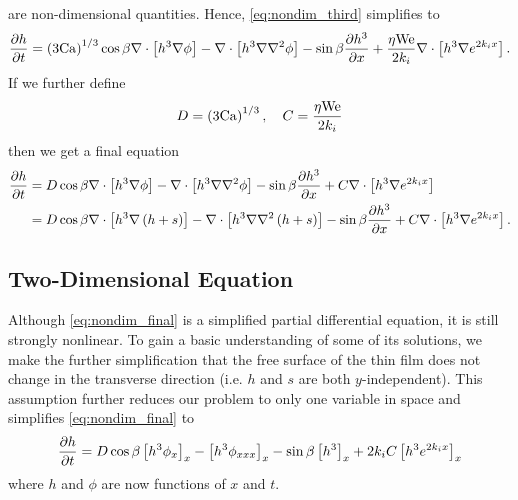 are non-dimensional quantities. Hence, 
\cref{eq:nondim_third} simplifies to 
\begin{align}
    \frac{\partial h}{\partial t} = \left( 3\mathrm{Ca} \right)^{1/3} \cos\beta \nabla \cdot \left[  h^3 \nabla \phi  \right] - 
    \nabla \cdot \left[ h^3 \nabla\nabla^2\phi  \right] - 
    \sin\beta \frac{\partial h^3}{\partial x} + 
    \frac{\eta \mathrm{We}}{2k_i} \nabla \cdot \left[ h^3 \nabla e^{2k_i x} \right].
    \label{eq:nondim_fourth}
\end{align}  
If we further define 
\begin{equation*}
    D = \left( 3\mathrm{Ca} \right)^{1/3}, \quad C = \frac{\eta \mathrm{We}}{2k_i}
\end{equation*}
then we get a final equation 
\begin{align}
    \begin{aligned}
    \frac{\partial h}{\partial t} &= D \cos\beta \nabla \cdot \left[  h^3 \nabla \phi  \right] - 
    \nabla \cdot \left[ h^3 \nabla\nabla^2\phi  \right] - 
    \sin\beta \frac{\partial h^3}{\partial x} + 
    C \nabla \cdot \left[ h^3 \nabla e^{2k_i x} \right]\\
    &= D \cos\beta \nabla \cdot \left[  h^3 \nabla \left( h+s \right)  \right] - 
    \nabla \cdot \left[ h^3 \nabla\nabla^2\left( h+s \right)  \right] - 
    \sin\beta \frac{\partial h^3}{\partial x} + 
    C \nabla \cdot \left[ h^3 \nabla e^{2k_i x} \right].
    \end{aligned}
    \label{eq:nondim_final}
\end{align}  

\subsection{Two-Dimensional Equation}
Although \cref{eq:nondim_final} is a simplified partial differential equation, 
it is still strongly nonlinear. To gain a basic understanding of some of its solutions,
we make the further simplification that the free surface of the thin film does not change
in the transverse direction (i.e.\! $h$ and $s$ are both $y$-independent). This assumption
further reduces our problem to only one variable in space and simplifies \cref{eq:nondim_final} to 
\begin{align}
    \frac{\partial h}{\partial t} = D\cos\beta \left[ h^3 \phi_x \right]_x - \left[ h^3 \phi_{xxx} \right]_{x} - \sin\beta \left[ h^3 \right]_{x} + 2k_iC \left[ h^3 e^{2k_ix} \right]_x
    \label{eq:two_dim_final}
\end{align}
where $h$ and $\phi$ are now functions of $x$ and $t$.    
